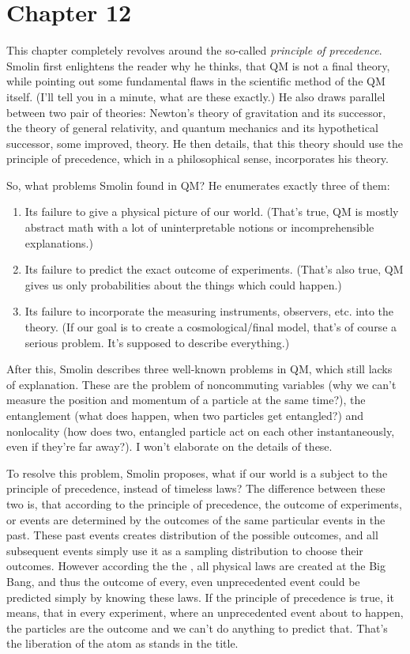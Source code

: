 \section{Chapter 12}
This chapter completely revolves around the so-called \textit{principle of precedence}. Smolin first enlightens the reader why he thinks, that QM is not a final theory, while pointing out some fundamental flaws in the scientific method of the QM itself. (I'll tell you in a minute, what are these exactly.) He also draws parallel between two pair of theories: Newton's theory of gravitation and its successor, the theory of general relativity, and quantum mechanics and its hypothetical successor, some improved,  theory. He then details, that this theory should use the principle of precedence, which in a philosophical sense, incorporates his  theory. \par
So, what problems Smolin found in QM? He enumerates exactly three of them:
\begin{enumerate}
	\item Its failure to give a physical picture of our world. (That's true, QM is mostly abstract math with a lot of uninterpretable notions or incomprehensible explanations.)
	\item Its failure to predict the exact outcome of experiments. (That's also true, QM gives us only probabilities about the things which could happen.)
	\item Its failure to incorporate the measuring instruments, observers, etc. into the theory. (If our goal is to create a cosmological/final model, that's of course a serious problem. It's supposed to describe everything.)
\end{enumerate}
After this, Smolin describes three well-known problems in QM, which still lacks of explanation. These are the problem of noncommuting variables (why we can't measure the position and momentum of a particle at the same time?), the entanglement (what does happen, when two particles get entangled?) and nonlocality (how does two, entangled particle act on each other instantaneously, even if they're far away?). I won't elaborate on the details of these. \par
To resolve this problem, Smolin proposes, what if our world is a subject to the principle of precedence, instead of timeless laws? The difference between these two is, that according to the principle of precedence, the outcome of experiments, or events are determined by the outcomes of the same particular events in the past. These past events creates distribution of the possible outcomes, and all subsequent events simply use it as a sampling distribution to choose their outcomes. However according the the , all physical laws are created at the Big Bang, and thus the outcome of every, even unprecedented event could be predicted simply by knowing these laws. If the principle of precedence is true, it means, that in every experiment, where an unprecedented event about to happen, the particles are  the outcome and we can't do anything to predict that. That's the liberation of the atom as stands in the title. \par
